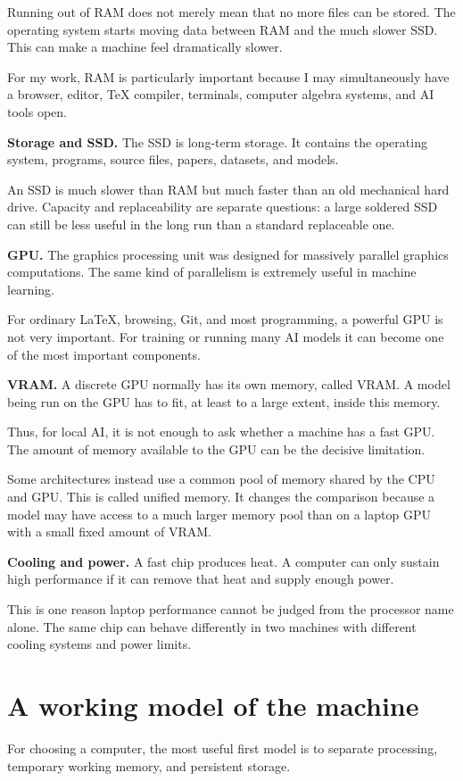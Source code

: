 Running out of RAM does not merely mean
that no more files can be stored.  The
operating system starts moving data
between RAM and the much slower SSD.  This
can make a machine feel dramatically
slower.

For my work, RAM is particularly important
because I may simultaneously have a
browser, editor, TeX compiler, terminals,
computer algebra systems, and AI tools
open.

\medskip\noindent
{\bf Storage and SSD.}
The SSD is long-term storage.  It contains
the operating system, programs, source
files, papers, datasets, and models.

An SSD is much slower than RAM but much
faster than an old mechanical hard drive.
Capacity and replaceability are separate
questions: a large soldered SSD can still
be less useful in the long run than a
standard replaceable one.

\medskip\noindent
{\bf GPU.}
The graphics processing unit was designed
for massively parallel graphics
computations.  The same kind of
parallelism is extremely useful in machine
learning.

For ordinary LaTeX, browsing, Git, and
most programming, a powerful GPU is not
very important.  For training or running
many AI models it can become one of the
most important components.

\medskip\noindent
{\bf VRAM.}
A discrete GPU normally has its own memory,
called VRAM.  A model being run on the GPU
has to fit, at least to a large extent,
inside this memory.

Thus, for local AI, it is not enough to
ask whether a machine has a fast GPU.  The
amount of memory available to the GPU can
be the decisive limitation.

Some architectures instead use a common
pool of memory shared by the CPU and GPU.
This is called unified memory.  It changes
the comparison because a model may have
access to a much larger memory pool than
on a laptop GPU with a small fixed amount
of VRAM.

\medskip\noindent
{\bf Cooling and power.}
A fast chip produces heat.  A computer can
only sustain high performance if it can
remove that heat and supply enough power.

This is one reason laptop performance
cannot be judged from the processor name
alone.  The same chip can behave
differently in two machines with different
cooling systems and power limits.

\section{A working model of the machine}
For choosing a computer, the most useful
first model is to separate processing,
temporary working memory, and persistent
storage.

